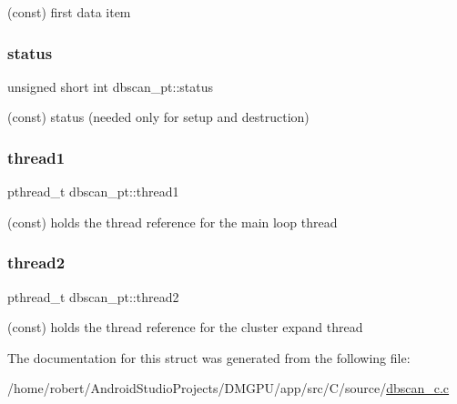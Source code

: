 (const) first data item 

\mbox{\label{structdbscan__pt_a5a42d9fe57034198ed5250f6f0ddb2cb}} 
\subsubsection{\texorpdfstring{status}{status}}
{\footnotesize\ttfamily unsigned short int dbscan\+\_\+pt\+::status}



(const) status (needed only for setup and destruction) 

\mbox{\label{structdbscan__pt_a2535cf2a4899d30b008b26dfa92bd44c}} 
\subsubsection{\texorpdfstring{thread1}{thread1}}
{\footnotesize\ttfamily pthread\+\_\+t dbscan\+\_\+pt\+::thread1}



(const) holds the thread reference for the main loop thread 

\mbox{\label{structdbscan__pt_a4c0ec8c2730f9a56a4b186692de79c47}} 
\subsubsection{\texorpdfstring{thread2}{thread2}}
{\footnotesize\ttfamily pthread\+\_\+t dbscan\+\_\+pt\+::thread2}



(const) holds the thread reference for the cluster expand thread 



The documentation for this struct was generated from the following file\+:\begin{DoxyCompactItemize}
\item 
/home/robert/\+Android\+Studio\+Projects/\+D\+M\+G\+P\+U/app/src/\+C/source/\mbox{\hyperlink{dbscan__c_8c}{dbscan\+\_\+c.\+c}}\end{DoxyCompactItemize}
